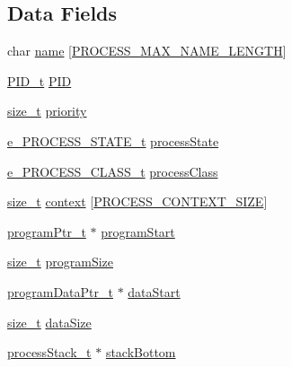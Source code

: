 \subsection*{Data Fields}
\begin{DoxyCompactItemize}
\item 
char \hyperlink{structs__pcb__stuct_a35c285b13db8c228686d0f8a6757df55}{name} \mbox{[}\hyperlink{pcb_8h_acd2dea966e4e5b760451b4fcc66f6cce}{P\+R\+O\+C\+E\+S\+S\+\_\+\+M\+A\+X\+\_\+\+N\+A\+M\+E\+\_\+\+L\+E\+N\+G\+TH}\mbox{]}
\item 
\hyperlink{pcb_8h_a679b474107b599ed5e2597c8863176dc}{P\+I\+D\+\_\+t} \hyperlink{structs__pcb__stuct_adb2bb17e9c8a673c566b6ca4abae4c3d}{P\+ID}
\item 
\hyperlink{system_8h_a7c94ea6f8948649f8d181ae55911eeaf}{size\+\_\+t} \hyperlink{structs__pcb__stuct_a55fc1faff03a8b63cf31bb2bfa23bdb3}{priority}
\item 
\hyperlink{pcb_8h_a8461d6c03c00b03bad59b5a29d27b902}{e\+\_\+\+P\+R\+O\+C\+E\+S\+S\+\_\+\+S\+T\+A\+T\+E\+\_\+t} \hyperlink{structs__pcb__stuct_a55061533a89faf41941be8e04f51166c}{process\+State}
\item 
\hyperlink{pcb_8h_ab3268ce0bdfc94e5757917d42c73d9f1}{e\+\_\+\+P\+R\+O\+C\+E\+S\+S\+\_\+\+C\+L\+A\+S\+S\+\_\+t} \hyperlink{structs__pcb__stuct_a3b2308e186f613a782a1da4a798ef73b}{process\+Class}
\item 
\hyperlink{system_8h_a7c94ea6f8948649f8d181ae55911eeaf}{size\+\_\+t} \hyperlink{structs__pcb__stuct_a54d339e4c45de597429888e4654c03c8}{context} \mbox{[}\hyperlink{pcb_8h_abb5f1eb47c3ac477582ecc49dc8990ee}{P\+R\+O\+C\+E\+S\+S\+\_\+\+C\+O\+N\+T\+E\+X\+T\+\_\+\+S\+I\+ZE}\mbox{]}
\item 
\hyperlink{pcb_8h_aeac19486a8c4d8375298127cee4305b1}{program\+Ptr\+\_\+t} $\ast$ \hyperlink{structs__pcb__stuct_aa3a3020774ef77f1de4de8dd23d78743}{program\+Start}
\item 
\hyperlink{system_8h_a7c94ea6f8948649f8d181ae55911eeaf}{size\+\_\+t} \hyperlink{structs__pcb__stuct_a18647991a99249b0a51f30ee6004a81c}{program\+Size}
\item 
\hyperlink{pcb_8h_a4f8494f06fbe4ad011320128964be020}{program\+Data\+Ptr\+\_\+t} $\ast$ \hyperlink{structs__pcb__stuct_ac5d905bfc91bb5364487b48fe06a7fc2}{data\+Start}
\item 
\hyperlink{system_8h_a7c94ea6f8948649f8d181ae55911eeaf}{size\+\_\+t} \hyperlink{structs__pcb__stuct_aaaf251e1893020160fb154a5e341f604}{data\+Size}
\item 
\hyperlink{pcb_8h_a39f696168968032d4df0637fad2ad52c}{process\+Stack\+\_\+t} $\ast$ \hyperlink{structs__pcb__stuct_aec0fa5de5c09ee7db1da3b953af71321}{stack\+Bottom}

\end{DoxyCompactItemize}
